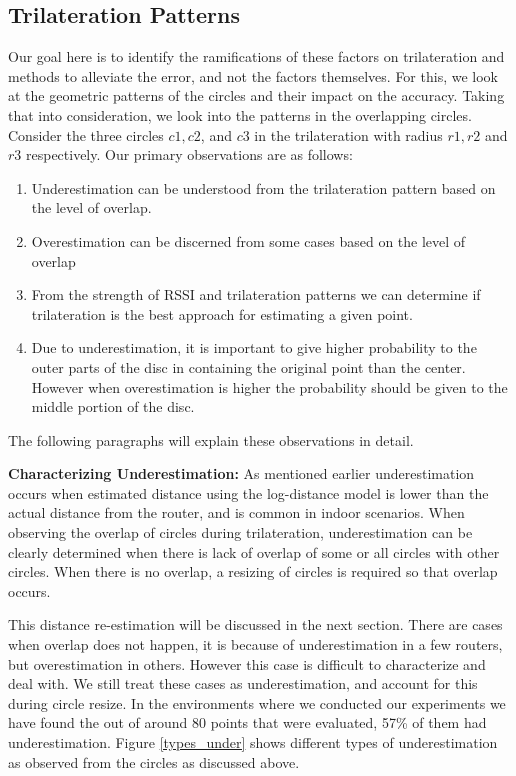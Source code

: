 \subsection {Trilateration Patterns}
Our goal here is to identify the ramifications of these factors on trilateration and methods to alleviate the error, and not the factors themselves. For this, we look at the geometric patterns of the circles and their impact on the accuracy. Taking that into consideration, we look into the patterns in the overlapping circles. Consider the three circles $c1, c2$, and $c3$ in the trilateration with radius $r1, r2$ and $r3$ respectively. Our primary observations are as follows:
\begin{enumerate}
    \item Underestimation can be understood from the trilateration pattern based on the level of overlap. 
    \item  Overestimation can be discerned from some cases based on the level of overlap
    \item From the strength of RSSI and trilateration patterns we can determine if trilateration is the best approach for estimating a given point. 
    \item Due to underestimation, it is important to give higher probability to the outer parts of the disc in containing the original point than the center. However when overestimation is higher the probability should be given to the middle portion of the disc.
\end{enumerate}
The following paragraphs will explain these observations in detail. 

\textbf{Characterizing Underestimation:} As mentioned earlier underestimation occurs when estimated distance using the log-distance model is lower than the actual distance from the router, and is common in indoor scenarios. When observing the overlap of circles during trilateration, underestimation can be clearly determined when there is lack of overlap of some or all circles with other circles. When there is no overlap, a resizing of circles is required so that overlap occurs. 
This distance re-estimation will be discussed in the next section. There are cases when overlap does not happen, it is because of underestimation in a few routers, but overestimation in others. However this case is difficult to characterize and deal with. We still treat these cases as underestimation, and account for this during circle resize. 
In the environments where we conducted our experiments we have found the out of around 80 points that were evaluated, 57\% of them had underestimation. Figure \ref{types_under} shows different types of underestimation as observed from the circles as discussed above.

